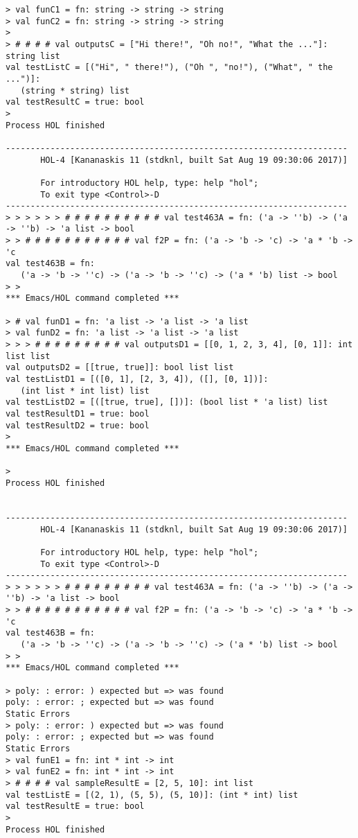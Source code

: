 \documentclass{report}
\begin{document}
\begin{session}
\begin{scriptsize}
\begin{verbatim}
> val funC1 = fn: string -> string -> string
> val funC2 = fn: string -> string -> string
> 
> # # # # val outputsC = ["Hi there!", "Oh no!", "What the ..."]: string list
val testListC = [("Hi", " there!"), ("Oh ", "no!"), ("What", " the ...")]:
   (string * string) list
val testResultC = true: bool
> 
Process HOL finished

---------------------------------------------------------------------
       HOL-4 [Kananaskis 11 (stdknl, built Sat Aug 19 09:30:06 2017)]

       For introductory HOL help, type: help "hol";
       To exit type <Control>-D
---------------------------------------------------------------------
> > > > > > # # # # # # # # # # val test463A = fn: ('a -> ''b) -> ('a -> ''b) -> 'a list -> bool
> > # # # # # # # # # # # val f2P = fn: ('a -> 'b -> 'c) -> 'a * 'b -> 'c
val test463B = fn:
   ('a -> 'b -> ''c) -> ('a -> 'b -> ''c) -> ('a * 'b) list -> bool
> > 
*** Emacs/HOL command completed ***

> # val funD1 = fn: 'a list -> 'a list -> 'a list
> val funD2 = fn: 'a list -> 'a list -> 'a list
> > > # # # # # # # # # val outputsD1 = [[0, 1, 2, 3, 4], [0, 1]]: int list list
val outputsD2 = [[true, true]]: bool list list
val testListD1 = [([0, 1], [2, 3, 4]), ([], [0, 1])]:
   (int list * int list) list
val testListD2 = [([true, true], [])]: (bool list * 'a list) list
val testResultD1 = true: bool
val testResultD2 = true: bool
> 
*** Emacs/HOL command completed ***

> 
Process HOL finished


---------------------------------------------------------------------
       HOL-4 [Kananaskis 11 (stdknl, built Sat Aug 19 09:30:06 2017)]

       For introductory HOL help, type: help "hol";
       To exit type <Control>-D
---------------------------------------------------------------------
> > > > > > # # # # # # # # # val test463A = fn: ('a -> ''b) -> ('a -> ''b) -> 'a list -> bool
> > # # # # # # # # # # # val f2P = fn: ('a -> 'b -> 'c) -> 'a * 'b -> 'c
val test463B = fn:
   ('a -> 'b -> ''c) -> ('a -> 'b -> ''c) -> ('a * 'b) list -> bool
> > 
*** Emacs/HOL command completed ***

> poly: : error: ) expected but => was found
poly: : error: ; expected but => was found
Static Errors
> poly: : error: ) expected but => was found
poly: : error: ; expected but => was found
Static Errors
> val funE1 = fn: int * int -> int
> val funE2 = fn: int * int -> int
> # # # # val sampleResultE = [2, 5, 10]: int list
val testListE = [(2, 1), (5, 5), (5, 10)]: (int * int) list
val testResultE = true: bool
> 
Process HOL finished
\end{verbatim}
  \end{scriptsize}
\end{session}
\end{document}
